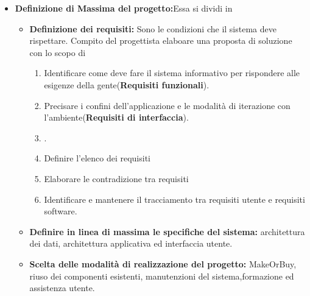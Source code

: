 \documentclass{article}
\begin{document}
\begin{itemize}
\item \textbf{Definizione di Massima del progetto:}Essa si dividi in
\begin{itemize}
    \item \textbf{Definizione dei requisiti:} Sono le condizioni che il sistema deve rispettare. Compito del progettista elaboare una proposta di soluzione con lo scopo di
    \begin{enumerate}
        \item Identificare come deve fare il sistema informativo per rispondere alle esigenze della gente(\textbf{Requisiti funzionali}).
        \item Precisare i confini dell'applicazione e le modalità di iterazione con l'ambiente(\textbf{Requisiti di interfaccia}).
        \item .
        \item Definire l'elenco dei requisiti
        \item Elaborare le contradizione tra requisiti
        \item Identificare e mantenere il tracciamento tra requisiti utente e requisiti software.
    \end{enumerate}
    \item \textbf{Definire in linea di massima le specifiche del sistema:} architettura dei dati, architettura applicativa ed interfaccia utente.
    \item \textbf{Scelta delle modalità di realizzazione del progetto:} MakeOrBuy, riuso dei componenti esistenti, manutenzioni del sistema,formazione ed assistenza utente.
\end{itemize}
\end{itemize}
\end{document}
